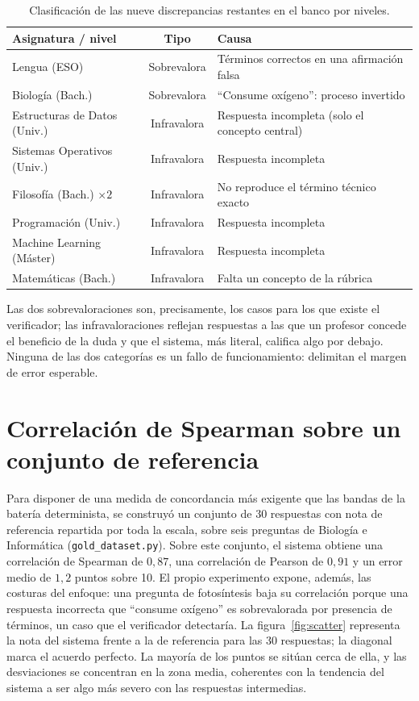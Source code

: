 \begin{table}[ht]
\centering
\caption{Clasificación de las nueve discrepancias restantes en el banco por niveles.}
\label{tab:discrep}
\small
\begin{tabularx}{\textwidth}{>{\raggedright\arraybackslash}p{} c >{\raggedright\arraybackslash}X}
\toprule
Asignatura / nivel & Tipo & Causa \\
\midrule
Lengua (ESO) & Sobrevalora & Términos correctos en una afirmación falsa \\
Biología (Bach.) & Sobrevalora & ``Consume oxígeno'': proceso invertido \\
Estructuras de Datos (Univ.) & Infravalora & Respuesta incompleta (solo el concepto central) \\
Sistemas Operativos (Univ.) & Infravalora & Respuesta incompleta \\
Filosofía (Bach.) $\times 2$ & Infravalora & No reproduce el término técnico exacto \\
Programación (Univ.) & Infravalora & Respuesta incompleta \\
Machine Learning (Máster) & Infravalora & Respuesta incompleta \\
Matemáticas (Bach.) & Infravalora & Falta un concepto de la rúbrica \\
\bottomrule
\end{tabularx}
\end{table}

Las dos sobrevaloraciones son, precisamente, los casos para los que existe el verificador; las infravaloraciones reflejan respuestas a las que un profesor concede el beneficio de la duda y que el sistema, más literal, califica algo por debajo. Ninguna de las dos categorías es un fallo de funcionamiento: delimitan el margen de error esperable.

\section{Correlación de Spearman sobre un conjunto de referencia}

Para disponer de una medida de concordancia más exigente que las bandas de la batería determinista, se construyó un conjunto de 30 respuestas con nota de referencia repartida por toda la escala, sobre seis preguntas de Biología e Informática (\texttt{gold\_dataset.py}). Sobre este conjunto, el sistema obtiene una correlación de Spearman de $0{,}87$, una correlación de Pearson de $0{,}91$ y un error medio de $1{,}2$ puntos sobre 10. El propio experimento expone, además, las costuras del enfoque: una pregunta de fotosíntesis baja su correlación porque una respuesta incorrecta que ``consume oxígeno'' es sobrevalorada por presencia de términos, un caso que el verificador detectaría. La figura~\ref{fig:scatter} representa la nota del sistema frente a la de referencia para las 30 respuestas; la diagonal marca el acuerdo perfecto. La mayoría de los puntos se sitúan cerca de ella, y las desviaciones se concentran en la zona media, coherentes con la tendencia del sistema a ser algo más severo con las respuestas intermedias.

